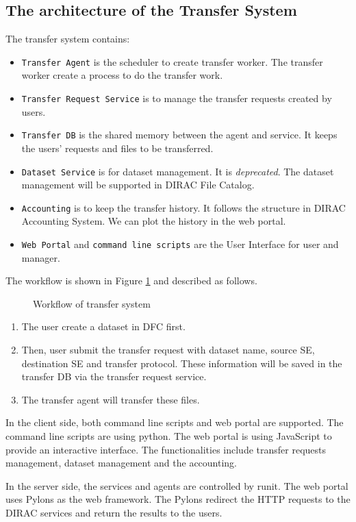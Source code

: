 \subsection{The architecture of the Transfer System}

The transfer system contains:

\begin{itemize}
    \item {\tt Transfer Agent} is the scheduler to create transfer worker.
          The transfer worker create a process to do the transfer work.
    \item {\tt Transfer Request Service} is to manage the transfer requests
          created by users.
    \item {\tt Transfer DB} is the shared memory between the agent and 
          service. It keeps the users' requests and files to be transferred.
    \item {\tt Dataset Service} is for dataset management. It is 
          {\em deprecated}. The dataset management will be supported in DIRAC 
          File Catalog.
    \item {\tt Accounting} is to keep the transfer history.
          It follows the structure in DIRAC Accounting System.
          We can plot the history in the web portal.
    \item {\tt Web Portal} and {\tt command line scripts} are the 
          User Interface for user and manager.
\end{itemize}

The workflow is shown in Figure \ref{fig:workflow} and described as follows.
\begin{figure}
    
    \caption{Workflow of transfer system} \label{fig:workflow}
\end{figure}

\begin{enumerate}
\item The user create a dataset in DFC first.
\item Then, user submit the transfer request with dataset name,
source SE, destination SE and transfer protocol.
These information will be saved in the transfer DB via
the transfer request service.
\item The transfer agent will transfer these files.
\end{enumerate}

In the client side, both command line scripts and web portal are supported.
The command line scripts are using python. The web portal is using 
JavaScript to provide an interactive interface. The functionalities
include transfer requests management, dataset management and the 
accounting.

In the server side, the services and agents are controlled by runit.
The web portal uses Pylons as the web framework.
The Pylons redirect the HTTP requests to the DIRAC services and 
return the results to the users.
